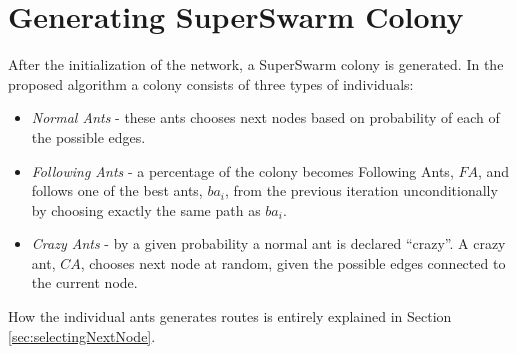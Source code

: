 \section{Generating SuperSwarm Colony}
\label{sec:algoGeneratingSuperSwarm}
After the initialization of the network, a SuperSwarm colony is generated. In the proposed algorithm a colony consists of three types of individuals:
\begin{itemize}
\item \textit{Normal Ants} - these ants chooses next nodes based on probability of each of the possible edges. 
\item \textit{Following Ants} - a percentage of the colony becomes Following Ants, $FA$, and follows one of the best ants, $ba_i$, from the previous iteration unconditionally by choosing exactly the same path as $ba_i$.
\item \textit{Crazy Ants} - by a given probability a normal ant is declared ``crazy''. A crazy ant, $CA$, chooses next node at random, given the possible edges connected to the current node.  
\end{itemize}

How the individual ants generates routes is entirely explained in Section \vref{sec:selectingNextNode}.
